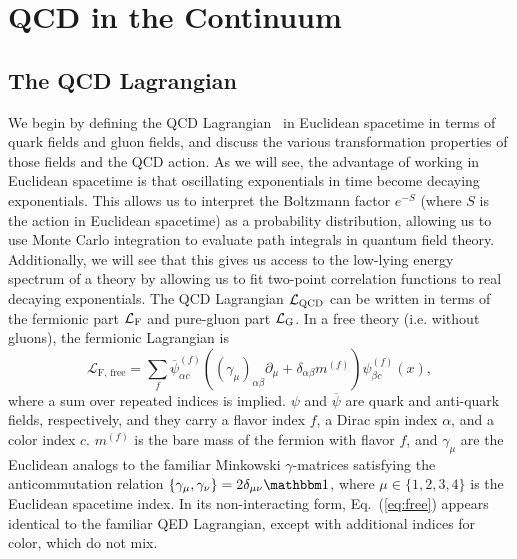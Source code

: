 \section{QCD in the Continuum}
\subsection{The QCD Lagrangian}
We begin by defining the QCD Lagrangian~\cite{Fritzsch:1973pi} in Euclidean spacetime in terms of quark fields and gluon fields, and discuss the various transformation properties of those fields and the QCD action. As we will see, the advantage of working in Euclidean spacetime is that oscillating exponentials in time become decaying exponentials. This allows us to interpret the Boltzmann factor $e^{-S}$ (where $S$ is the action in Euclidean spacetime) as a probability distribution, allowing us to use Monte Carlo integration to evaluate path integrals in quantum field theory. Additionally, we will see that this gives us access to the low-lying energy spectrum of a theory by allowing us to fit two-point correlation functions to real decaying exponentials. The QCD Lagrangian $\mathcal L_{\rm{QCD}}$ can be written in terms of the fermionic part $\mathcal L_{\rm F}$ and pure-gluon part $\mathcal L_{\rm G}$. In a free theory (i.e. without gluons), the fermionic Lagrangian is
\begin{equation}\label{eq:free}
    \mathcal L_{\text{F, free}} = \sum_{f} \overline \psi^{(f)}_{\alpha c}\left((\gamma_\mu)_{\alpha\beta} \partial_\mu + \delta_{\alpha\beta}m^{(f)}\right)\psi^{(f)}_{\beta c}(x),
\end{equation}
where a sum over repeated indices is implied. $\psi$ and $\overline \psi$ are quark and anti-quark fields, respectively, and they carry a flavor index $f$, a Dirac spin index $\alpha$, and a color index $c$. $m^{(f)}$ is the bare mass of the fermion with flavor $f$, and $\gamma_\mu$ are the Euclidean analogs to the familiar Minkowski $\gamma$-matrices satisfying the anticommutation relation $\lbrace\gamma_\mu, \gamma_\nu\rbrace=2\delta_{\mu\nu}\mathbbm 1$, where $\mu\in\lbrace 1,2,3,4\rbrace$ is the Euclidean spacetime index. In its non-interacting form, Eq.~(\ref{eq:free}) appears identical to the familiar QED Lagrangian, except with additional indices for color, which do not mix.

